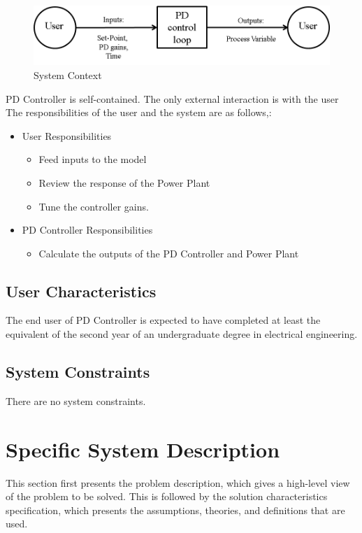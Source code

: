 \documentclass[12pt]{article}
\begin{document}
\begin{figure}
\begin{center}
\includegraphics[width=\textwidth]{../../../datafiles/PIDController/Fig_SystemContext.png}
\caption{System Context}
\label{Figure:systemContextDiag}
\end{center}
\end{figure}
PD Controller  is self-contained. The only external interaction is   with the  user The responsibilities of the  user  and the  system  are as follows,:

\begin{itemize}
\item{User Responsibilities}
\begin{itemize}
\item{Feed inputs to the model}
\item{Review the response of the  Power Plant}
\item{Tune the controller gains.}
\end{itemize}
\item{PD Controller Responsibilities}
\begin{itemize}
\item{Calculate the outputs of the  PD Controller  and  Power Plant}
\end{itemize}
\end{itemize}
\subsection{User Characteristics}
\label{Sec:UserChars}
The end user of  PD Controller  is expected to have completed at least the equivalent of the second year of an undergraduate degree in electrical engineering.

\subsection{System Constraints}
\label{Sec:SysConstraints}
There are no system constraints.

\section{Specific System Description}
\label{Sec:SpecSystDesc}
This section first presents the problem description, which gives a high-level view of the problem to be solved. This is followed by the solution characteristics specification, which presents the assumptions, theories, and definitions that are used.
\end{document}

